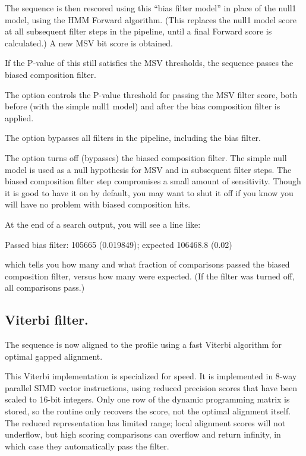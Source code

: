 The sequence is then rescored using this ``bias filter model'' in
place of the null1 model, using the HMM Forward algorithm. (This
replaces the null1 model score at all subsequent filter steps in the
pipeline, until a final Forward score is calculated.) A new MSV bit
score is obtained.

If the P-value of this still satisfies the MSV thresholds, the
sequence passes the biased composition filter. 

The  option controls the P-value threshold for
passing the MSV filter score, both before (with the simple null1
model) and after the bias composition filter is applied.

The  option bypasses all filters in the pipeline,
including the bias filter.

The  option turns off (bypasses) the biased
composition filter.  The simple null model is used as a null
hypothesis for MSV and in subsequent filter steps. The biased
composition filter step compromises a small amount of sensitivity.
Though it is good to have it on by default, you may want to shut it
off if you know you will have no problem with biased composition hits.

 At the end of a search output, you will see a line like:

\begin{sreoutput}
 Passed bias filter:                   105665  (0.019849); expected 106468.8 (0.02)
\end{sreoutput}

which tells you how many and what fraction of comparisons passed the
biased composition filter, versus how many were expected. (If the
filter was turned off, all comparisons pass.)


\subsection{Viterbi filter.}

The sequence is now aligned to the profile using a fast Viterbi
algorithm for optimal gapped alignment.

This Viterbi implementation is specialized for speed.  It is
implemented in 8-way parallel SIMD vector instructions, using reduced
precision scores that have been scaled to 16-bit integers. Only one
row of the dynamic programming matrix is stored, so the routine only
recovers the score, not the optimal alignment itself. The reduced
representation has limited range; local alignment scores will not
underflow, but high scoring comparisons can overflow and return
infinity, in which case they automatically pass the filter.

